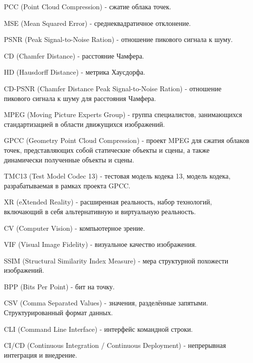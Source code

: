 \noindent PCC (Point Cloud Compression) - сжатие облака точек.

\noindent MSE (Mean Squared Error) - среднеквадратичное отклонение.

\noindent PSNR (Peak Signal-to-Noise Ration) - отношение пикового сигнала к
шуму.

\noindent CD (Chamfer Distance) - расстояние Чамфера.

\noindent HD (Hausdorff Distance) - метрика Хаусдорфа.

\noindent CD-PSNR (Chamfer Distance Peak Signal-to-Noise Ration) - отношение
пикового сигнала к шуму для расстояния Чамфера.

\noindent MPEG (Moving Picture Experts Group) - группа специалистов,
занимающихся стандартизацией в области движущихся изображений.

\noindent GPCC (Geometry Point Cloud Compression) - проект MPEG для сжатия
облаков точек, представляющих собой статические объекты и сцены, а также
динамически полученные объекты и сцены.

\noindent TMC13 (Test Model Codec 13) - тестовая модель кодека 13, модель
кодека, разрабатываемая в рамках проекта GPCC.

\noindent XR (eXtended Reality) - расширенная реальность, набор технологий,
включающий в себя альтернативную и виртуальную реальность.

\noindent CV (Computer Vision) - компьютерное зрение.

\noindent VIF (Visual Image Fidelity) - визуальное качество изображения.

\noindent SSIM (Structural Similarity Index Measure) - мера структурной
похожести изображений.

\noindent BPP (Bits Per Point) - бит на точку.

\noindent CSV (Comma Separated Values) - значения, разделённые запятыми.
Структурированный формат данных.

\noindent CLI (Command Line Interface) - интерфейс командной строки.

\noindent CI/CD (Continuous Integration / Continuous Deployment) - непрерывная интеграция и внедрение.
